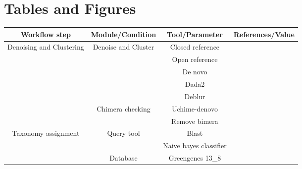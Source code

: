 
\newpage
\section*{Tables and Figures}


  \begin{table}[H]
    \centering
    \small
    \begin{tabular}{|c|c|c|c|}
      \hline
      \textbf{Workflow step} & \textbf{Module/Condition} & \textbf{Tool/Parameter} & \textbf{References/Value} \\
      \hline
      \multirow{7}{*}{Denoising and Clustering} & \multirow{5}{*}{Denoise and Cluster} & Closed reference & \cite{rognesVSEARCHVersatileOpen2016,bolyenReproducibleInteractiveScalable2019} \\
                                                &  & Open reference & \cite{rognesVSEARCHVersatileOpen2016,bolyenReproducibleInteractiveScalable2019} \\
                                                &  & De novo & \cite{rognesVSEARCHVersatileOpen2016,bolyenReproducibleInteractiveScalable2019} \\
                                                &  & \rowcolor{lightgray} Dada2 & \cite{Callahan2016} \\
                                                &  & Deblur & \cite{Amir2017,bolyenReproducibleInteractiveScalable2019} \\
                                                \cline{2-4}
                                                & \multirow{2}{*}{Chimera checking} & Uchime-denovo & \cite{rognesVSEARCHVersatileOpen2016,bolyenReproducibleInteractiveScalable2019} \\
                                                & & \rowcolor{lightgray} Remove bimera & \cite{Callahan2016} \\
                                                \hline
      \multirow{5}{*}{Taxonomy assignment} &  \multirow{2}{*}{Query tool} & Blast & \cite{camachoBLASTArchitectureApplications2009,bokulichOptimizingTaxonomicClassification2018} \\
                                           &  & \rowcolor{lightgray} Naive bayes classifier & \cite{bokulichOptimizingTaxonomicClassification2018} \\
                                           \cline{2-4}
                                           & \multirow{3}{*}{Database} & \rowcolor{lightgray} Greengenes 13\_8 & \cite{DeSantis2006} \\

\end{tabular}
\end{table}
